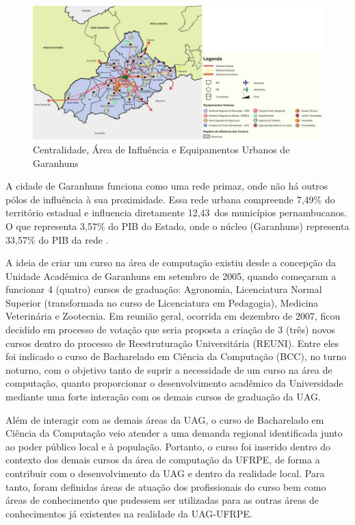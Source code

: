 \documentclass[
	12pt,				%
	openright,			%
  oneside,     %
	a4paper,			%
	chapter=TITLE,		%
	english,			%
	french,				%
	spanish,			%
	brazil				%
	]{abntex2}
\begin{document}
\begin{figure}[!htb]
    \centering
    \caption{\label{fig:centralidade}Centralidade, Área de Influência e Equipamentos Urbanos de Garanhuns}
    
    \includegraphics[width=\textwidth]{images/centralidade.png}
\end{figure}


A cidade de Garanhuns funciona como uma rede primaz, onde não há outros pólos de influência à sua proximidade. Essa rede urbana compreende 7,49\% do território estadual e influencia diretamente 12,43\ dos municípios pernambucanos. O que representa 3,57\% do PIB do Estado, onde o núcleo (Garanhuns) representa 33,57\% do PIB da rede \cite{fidem2017agencia}.

A ideia de criar um curso na área de computação existiu desde a concepção da Unidade Acadêmica de Garanhuns em setembro de 2005, quando começaram a funcionar 4 (quatro) cursos de graduação: Agronomia, Licenciatura Normal Superior (transformada no curso de Licenciatura em Pedagogia), Medicina Veterinária e Zootecnia. Em reunião geral, ocorrida em dezembro de 2007, ficou decidido em processo de votação que seria proposta a criação de 3 (três) novos cursos dentro do processo de Reestruturação Universitária (REUNI). Entre eles foi indicado o curso de Bacharelado em Ciência da Computação (BCC), no turno noturno, com o objetivo tanto de suprir a necessidade de um curso na área de computação, quanto proporcionar o desenvolvimento acadêmico da Universidade mediante uma forte interação com os demais cursos de graduação da UAG.

Além de interagir com as demais áreas da UAG, o curso de Bacharelado em Ciência da Computação veio atender a uma demanda regional identificada junto ao poder público local e à população. Portanto, o curso foi inserido dentro do contexto dos demais cursos da área de computação da UFRPE, de forma a contribuir com o desenvolvimento da UAG e dentro da realidade local. Para tanto, foram definidas áreas de atuação dos profissionais do curso bem como áreas de conhecimento que pudessem ser utilizadas para as outras áreas de conhecimentos já existentes na realidade da UAG-UFRPE.
\end{document}
